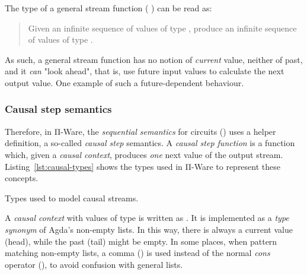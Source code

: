             The type of a general stream function (    )
            can be read as:

            \begin{quote}
                Given an infinite sequence of values of type ,
                produce an infinite sequence of values of type .
            \end{quote}

            As such, a general stream function has no notion of \emph{current} value, neither of past,
            and it \emph{can} "look ahead", that is, use future input values to calculate the next output value.
            One example of such a future-dependent behaviour.

            \subsubsection{Causal step semantics}
            \label{subsubsec:causal-step-semantics}
            Therefore, in Π-Ware, the \emph{sequential semantics} for circuits () uses a
            helper definition, a so-called \emph{causal step} semantics.
            A \emph{causal step function} is a function which, given a \emph{causal context},
            produces \emph{one} next value of the output stream.
            Listing~\ref{lst:causal-types} shows the types used in Π-Ware to represent these concepts.

            \begin{listing}[h]
                \newline
                \caption{Types used to model causal streams.\label{lst:causal-types}}
            \end{listing}

            A \emph{causal context} with values of type  is written as  .
            It is implemented as a \emph{type synonym} of Agda's non-empty lists.
            In this way, there is always a current value (head), while the past (tail) might be empty.
            In some places, when pattern matching non-empty lists, a comma (\AI{\_,\_}) is used
            instead of the normal \emph{cons} operator (), to avoid confusion with general lists.

